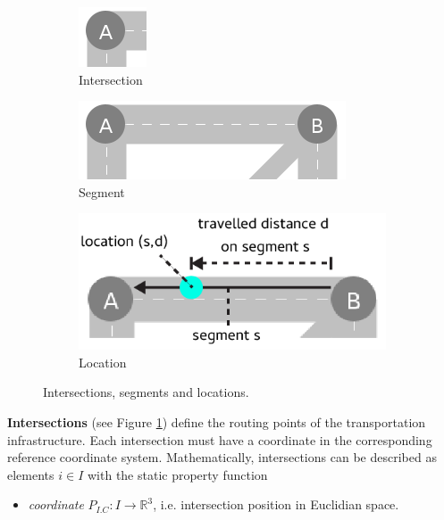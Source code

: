 \documentclass[graybox]{svmult}
\begin{document}
\begin{figure}
	\begin{subfigure}{.3\textwidth}
		\centering
		\includegraphics[scale=0.4]{../../concepts/intersection.png}
		\caption{Intersection}
		\label{fig:intersection}
	\end{subfigure}
	\hfill
	\begin{subfigure}{.3\textwidth}
		\centering
		\includegraphics[scale=0.4]{../../concepts/segment.png}
		\caption{Segment}
		\label{fig:segment}
	\end{subfigure}
	\hfill
		\begin{subfigure}{.3\textwidth}
		\centering
		\includegraphics[scale=0.4]{../../concepts/location.png}
		\caption{Location}
		\label{fig:location}
	\end{subfigure}
\hfill
	\caption{Intersections, segments and locations.}
	\label{fig:intersections-segments}	
\end{figure}

\noindent
\textbf{Intersections} (see Figure \ref{fig:intersection})
define the routing points of the transportation infrastructure.
Each intersection must have a coordinate in the corresponding reference coordinate system.
Mathematically, intersections can be described as elements $i \in I$ with the static property function
\begin{itemize}
	\item \textit{coordinate} $P_{I.C}: I \rightarrow \mathbb{R}^3$, i.e. intersection position in Euclidian space.
\end{itemize}
\vspace{2mm}
\end{document}

